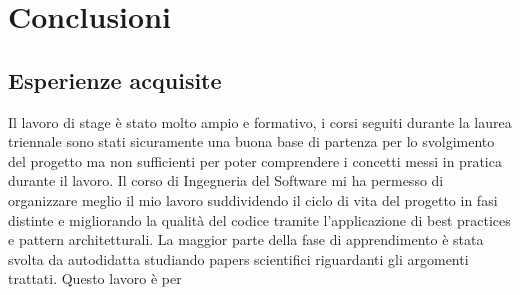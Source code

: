 \section{Conclusioni}

\subsection{Esperienze acquisite}
Il lavoro di stage è stato molto ampio e formativo, i corsi seguiti durante la laurea triennale sono stati sicuramente una buona base di partenza per lo svolgimento del progetto ma non sufficienti per poter comprendere i concetti messi in pratica durante il lavoro. Il corso di Ingegneria del Software mi ha permesso di organizzare meglio il mio lavoro suddividendo il ciclo di vita del progetto in fasi distinte e migliorando la qualità del codice tramite l'applicazione di best practices e pattern architetturali. La maggior parte della fase di apprendimento è stata svolta da autodidatta studiando papers scientifici riguardanti gli argomenti trattati. Questo lavoro è per